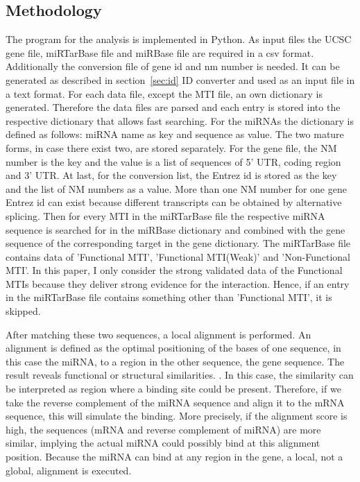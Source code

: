 \documentclass[12pt]{article}
\begin{document}
\vspace{0.5cm}


\subsection{Methodology}
\label{sec:meth}


The program for the analysis is implemented in Python. As input files the UCSC gene file, miRTarBase file and miRBase file are required in a csv format. Additionally the conversion file of gene id and nm number is needed. It can be generated as described in section~\ref{sec:id} ID converter and used as an input file in a text format. 
For each data file, except the MTI file, an own dictionary is generated. Therefore the data files are parsed and each entry is stored into the respective dictionary that allows fast searching. For the miRNAs the dictionary is defined as follows: miRNA name as key and sequence as value. The two mature forms, in case there exist two, are stored separately. For the gene file, the NM number is the key and the value is a list of sequences of 5' UTR, coding region and 3' UTR. At last, for the conversion list, the Entrez id is stored as the key and the list of NM numbers as a value. More than one NM number for one gene Entrez id can exist because different transcripts can be obtained by alternative splicing. 
Then for every MTI in the miRTarBase file the respective miRNA sequence is searched for in the miRBase dictionary and combined with the gene sequence of the corresponding target in the gene dictionary. The miRTarBase file contains data of 'Functional MTI', 'Functional MTI(Weak)' and 'Non-Functional MTI'. In this paper, I only consider the strong validated data of the Functional MTIs because they deliver strong evidence for the interaction. Hence, if an entry in the miRTarBase file contains something other than 'Functional MTI', it is skipped.

After matching these two sequences, a local alignment is performed. An alignment is defined as the optimal positioning of the bases of one sequence, in this case the miRNA, to a region in the other sequence, the gene sequence. The result reveals functional or structural similarities. \cite{alignment}. In this case, the similarity can be interpreted as region where a binding site could be present. Therefore, if we take the reverse complement of the miRNA sequence and align it to the mRNA sequence, this will simulate the binding. More precisely, if the alignment score is high, the sequences (mRNA and reverse complement of miRNA) are more similar, implying the actual miRNA could possibly bind at this alignment position. Because the miRNA can bind at any region in the gene, a local, not a global, alignment is executed.\\
\end{document}
